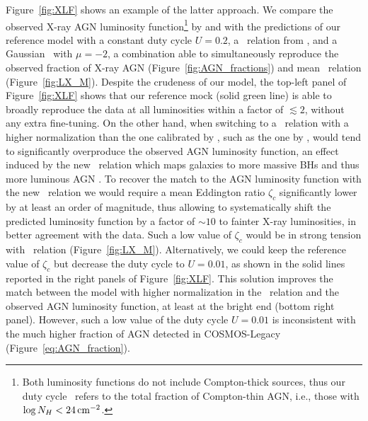 Figure~\ref{fig:XLF} shows an example of the latter approach. We compare the observed X-ray AGN luminosity function\footnote{Both luminosity functions do not include Compton-thick sources, thus our duty cycle \UMBHz\ refers to the total fraction of Compton-thin AGN, i.e., those with $\log N_H<24\, {\rm cm^{-2}}$.} by \citet[][orange dotted lines]{2014ApJ...786..104U} and \citet[][blue filled circles]{2015ApJ...804..104M} with the predictions of our reference model with a constant duty cycle $U=0.2$, a \MBHMS\ relation from \citet{2015ApJ...813...82R}, and a Gaussian \PLz\ with $\mu=-2$, a combination able to simultaneously reproduce the observed fraction of X-ray AGN (Figure~\ref{fig:AGN_fractions}) and mean \LXMS\ relation (Figure~\ref{fig:LX_M}). Despite the crudeness of our model, the top-left panel of Figure~\ref{fig:XLF} shows that our reference mock (solid green line) is able to broadly reproduce the data at all luminosities within a factor of $\lesssim 2$, without any extra fine-tuning. On the other hand, when switching to a \MBHMS\ relation with a higher normalization than the one calibrated by \citet{2015ApJ...813...82R}, such as the one by \citet{2019ApJ...876..155S}, would tend to significantly overproduce the observed AGN luminosity function, an effect induced by the new \MBHMS\ relation which maps galaxies to more massive BHs and thus more luminous AGN \citep[e.g.,][]{ShankarNat}. To recover the match to the AGN luminosity function with the new \MBHMS\ relation we would require a mean Eddington ratio $\zeta_c$ significantly lower by at least an order of magnitude, thus allowing to systematically shift the predicted luminosity function by a factor of $\sim 10$ to fainter X-ray luminosities, in better agreement with the data. Such a low value of $\zeta_c$ would be in strong tension with \LXMS\ relation (Figure~\ref{fig:LX_M}). Alternatively, we could keep the reference value of $\zeta_c$ but decrease the duty cycle to $U=0.01$, as shown in the solid lines reported in the right panels of Figure~\ref{fig:XLF}. This solution improves the match between the model with higher normalization in the \MBHMS\ relation and the observed AGN luminosity function, at least at the bright end (bottom right panel). However, such a low value of the duty cycle $U=0.01$ is inconsistent with the much higher fraction of AGN detected in COSMOS-Legacy (Figure~\ref{eq:AGN_fraction}).


